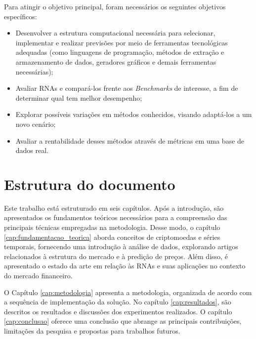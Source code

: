 Para atingir o objetivo principal, foram necessários os seguintes objetivos específicos:
\begin{itemize}
    \item Desenvolver a estrutura computacional necessária para selecionar, implementar e realizar previsões por meio de ferramentas tecnológicas adequadas (como linguagens de programação, métodos de extração e armazenamento de dados, geradores gráficos e demais ferramentas necessárias);
    \item Avaliar RNAs e compará-los frente aos \textit{Benchmarks} de interesse, a fim de determinar qual tem melhor desempenho;
    \item Explorar possíveis variações em métodos conhecidos, visando adaptá-los a um novo cenário;
    \item Avaliar a rentabilidade desses métodos através de métricas em uma base de dados real.
\end{itemize}

\section{Estrutura do documento}

Este trabalho está estruturado em seis capítulos. Após a introdução, são apresentados os fundamentos teóricos necessários para a compreensão das principais técnicas empregadas na metodologia. 
Desse modo, o capítulo \ref{cap:fundamentacao_teorica} aborda conceitos de criptomoedas e séries temporais, fornecendo uma introdução à análise de dados, explorando artigos relacionados 
à estrutura do mercado e à predição de preços. 
Além disso, é apresentado o estado da arte em relação às RNAs e suas aplicações no contexto do mercado financeiro.

O Capítulo \ref{cap:metodologia} apresenta a metodologia, organizada de acordo com a sequência de implementação da solução.
No capítulo \ref{cap:resultados}, são descritos os resultados e discussões dos experimentos realizados.
O capítulo \ref{cap:conclusao} oferece uma conclusão que abrange as principais contribuições, limitações da pesquisa e propostas para trabalhos futuros.